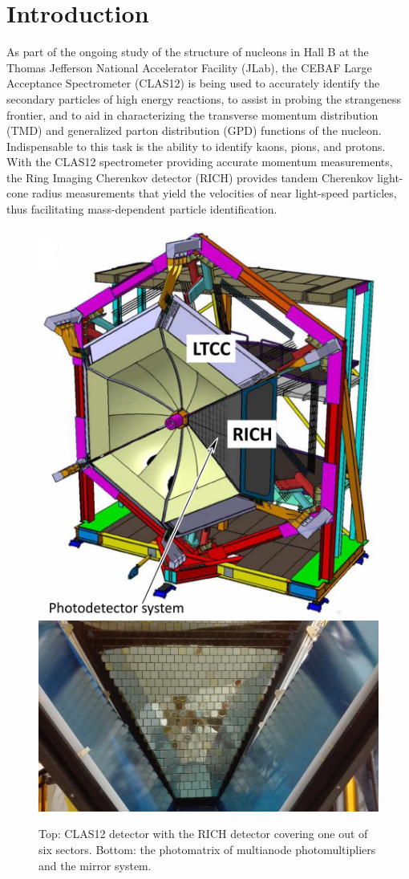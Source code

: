 \section{Introduction}
As part of the ongoing study of the structure of nucleons \cite{Avakian:2010ae}  in Hall B at the Thomas Jefferson National Accelerator Facility (JLab), the CEBAF Large Acceptance Spectrometer (CLAS12) \cite{Burkert:2020akg} is being used to accurately identify the secondary particles of high energy reactions, to assist in probing the strangeness frontier, and to aid in characterizing the transverse momentum distribution (TMD) and generalized parton distribution (GPD) functions of the nucleon. Indispensable to this task is the ability to identify kaons, pions, and protons.  With the CLAS12 spectrometer providing accurate momentum measurements, the Ring Imaging Cherenkov detector (RICH) \cite{Contalbrigo:2020,Contalbrigo:2020snw,Mirazita:2017vav,Contalbrigo:2014rqa} provides tandem Cherenkov light-cone radius measurements that yield the velocities of near light-speed particles, thus facilitating mass-dependent particle identification.

\begin{figure}[h!bt]
	\centering
	\includegraphics[width=0.65\linewidth]{figures/RICHdetector.pdf}
	\includegraphics[width=0.65\linewidth]{figures/RICHpanel_front.png}
	\caption{Top: CLAS12 detector with the RICH detector covering one out of six sectors. Bottom: the photomatrix of multianode photomultipliers and the mirror system.}
	\label{fig:RICHdetector}
\end{figure}

